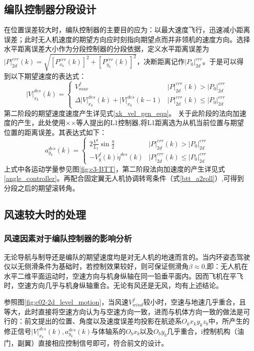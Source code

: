 \subsection{编队控制器分段设计} 
在位置误差较大时，编队控制器的主要目的应为：以最大速度飞行，迅速减小距离误差；此时无人机速度的期望方向应时刻指向期望点而并非领机的速度方向。选择水平距离误差大小作为分段控制器的分段依据，定义水平距离误差为$|P|_{2d}^{err}(k)=\sqrt{[P_{x_k}^{err}(k)]^2+[P_{y_k}^{err}(k)]^2}$，决断距离记作$|P_0|_{2d}^{err}$。于是可以得到以下期望速度的表达式：
\begin{equation}
    |V|_{x_k}^{des}(k)=
    \begin{cases}
        V_{max}^f& |P|_{2d}^{err}(k)>|P_0|_{2d}^{err}\\
        \Delta{|V|}_{x_k}^{des}(k)+{|V|}_{x_k}^{des}(k-1)& |P|_{2d}^{err}(k)\leq|P_0|_{2d}^{err}
    \end{cases}
    \end{equation}
第二阶段的期望速度速度产生详见式\ref{xk_vel_gen_equ}。
关于此阶段的法向加速度的产生，此处使用××等人提出的L1控制器,将L1距离选为从机当前位置与期望位置的距离误差。其表达式如下：
\begin{equation}
    a_{y_k}^{des}(k)=
    \begin{cases}
        2\frac{V^2}{L_1}\sin{\frac{\eta}{2}}& |P|_{2d}^{err}(k)>|P_0|_{2d}^{err}\\
        -V_g^{f}(k)\dot{\eta}^{des}(k)& |P|_{2d}^{err}(k)\leq|P_0|_{2d}^{err}
    \end{cases}
    \end{equation}
上式中各运动学量参见图\ref{fig:c3-BTT}，第二阶段法向加速度的产生详见式\ref{angle_controller}。再配合固定翼无人机协调转弯条件（式\ref{btt_a2roll}）,可得到分段之后的期望滚转角。
\subsection{风速较大时的处理} 
\subsubsection*{风速因素对于编队控制器的影响分析}
无论导航与制导还是编队的期望速度均是对无人机的地速而言的。当内环姿态驾驶仪以无侧滑条件为基础时，若控制效果较好，则可保证侧滑角$\beta\approx 0$,即：无人机在水平二维平面运动时，空速方向与机身纵轴在同一铅垂平面内。因而飞机在平飞时，空速方向几乎与机身纵轴重合。无论有风还是无风，均有上述结论。

参照图\ref{fig:c02-2d_level_motion}，当风速$V_{wind}^f$较小时，空速与地速几乎重合，且等大，此时直接将空速方向认为与空速方向一致，进而与机体方向一致的做法是可行的：前文提出的位置、角度以及速度误差均投影在航迹系$O_kx_ky_kz_b$中，所产生的修正信号$|V|_{x_k}^{des}(k),a_{y_k}^{des}(k)$与体轴系的$O_bx_b$以及$O_by_b$几乎重合，i控制机构（油门，副翼）直接相应控制信号即可，符合前文的设计。


